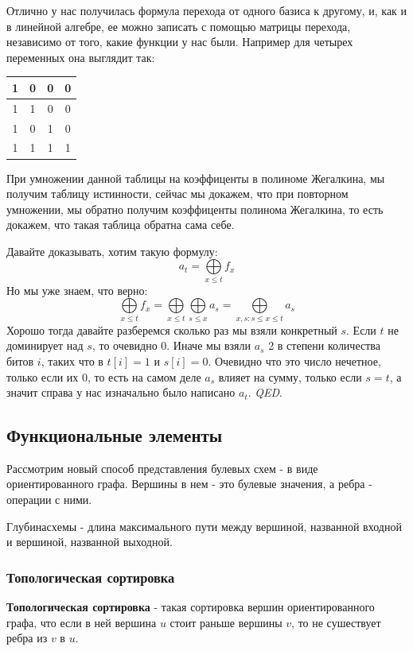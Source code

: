 Отлично у нас получилась формула перехода от одного базиса к другому, и, как и в линейной алгебре, ее можно записать с помощью матрицы перехода, независимо от того, какие функции у нас были. Например для четырех переменных она выглядит так:

\parbox{\textwidth}{
    \centering
    \begin{tabular}{ |c|c|c|c| }
        \hline
         1 & 0 & 0 & 0 \\
        \hline
         1 & 1 & 0 & 0 \\
        \hline
         1 & 0 & 1 & 0 \\
        \hline
         1 & 1 & 1 & 1 \\
        \hline
    \end{tabular}
}


При умножении данной таблицы на коэффиценты в полиноме Жегалкина, мы получим таблицу истинности, сейчас мы докажем, что при повторном умножении, мы обратно получим коэффиценты полинома Жегалкина, то есть докажем, что такая таблица обратна сама себе.

Давайте доказывать, хотим такую формулу: $$a_t=\bigoplus\limits_{x\leq t}f_x $$ Но мы уже знаем, что верно: $$\bigoplus\limits_{x\leq t}f_x = \bigoplus\limits_{x\leq t}\bigoplus\limits_{s\leq x}a_s=\bigoplus\limits_{x,s : s\leq x \leq t}a_s$$
Хорошо тогда давайте разберемся сколько раз мы взяли конкретный $s$. Если $t$ не доминирует над $s$, то очевидно 0. Иначе мы взяли $a_s$ 2 в степени количества битов $i$, таких что в $t[i]=1$ и $s[i]=0$. Очевидно что это число нечетное, только если их 0, то есть на самом деле $a_s$ влияет на сумму, только если $s=t$, а значит справа у нас изначально было написано $a_t$. \textit{QED}.

\subsection{Функциональные элементы}
Рассмотрим новый способ представления булевых схем - в виде ориентированного графа. Вершины в нем - это булевые значения, а ребра - операции с ними. 

$Глубина схемы$ - длина максимального пути между вершиной, названной входной и вершиной, названной выходной. 

\subsubsection{Топологическая сортировка}
\textbf{Топологическая сортировка} - такая сортировка вершин ориентированного графа, что если в ней вершина $u$ стоит раньше вершины $v$, то не сушествует ребра из $v$ в $u$.

